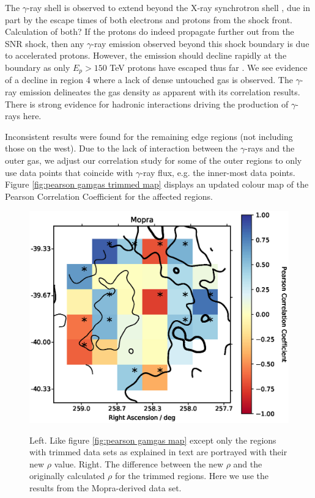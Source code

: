 \documentclass[12pt,a4paper]{article}
\begin{document}
The $\gamma$-ray shell is observed to extend beyond the X-ray synchrotron shell \citep{2018A&A...612A...6H}, due in part by the escape times of both electrons and protons from the shock front.
Calculation of both?
If the protons do indeed propagate further out from the SNR shock, then any $\gamma$-ray emission observed beyond this shock boundary is due to accelerated protons. 
However, the emission should decline rapidly at the boundary as only $E_p > 150$ TeV protons have escaped thus far \citep{2010PASJ...62.1127C}.
We see evidence of a decline in region 4 where a lack of dense untouched gas is observed. 
The $\gamma$-ray emission delineates the gas density as apparent with its correlation results.
There is strong evidence for hadronic interactions driving the production of $\gamma$-rays here.

Inconsistent results were found for the remaining edge regions (not including those on the west). 
Due to the lack of interaction between the $\gamma$-rays and the outer gas, we adjust our correlation study for some of the outer regions to only use data points that coincide with $\gamma$-ray flux, e.g. the inner-most data points.
Figure \ref{fig:pearson gamgas trimmed map} displays an updated colour map of the Pearson Correlation Coefficient for the affected regions.
\begin{figure}[H]
		\centering
	\includegraphics[width=1.00\linewidth, height=0.25\textheight]{pearsonmap_gam_mopHI_trimmed}
	\label{fig:corsigmap}
	\caption{Left. Like figure \ref{fig:pearson gamgas map} except only the regions with trimmed data sets as explained in text are portrayed with their new $\rho$ value. Right. The difference between the new $\rho$ and the originally calculated $\rho$ for the trimmed regions. Here we use the results from the Mopra-derived data set.}
	\label{fig:pearson mopgas trimmed map}
\end{figure}	
\end{document}
